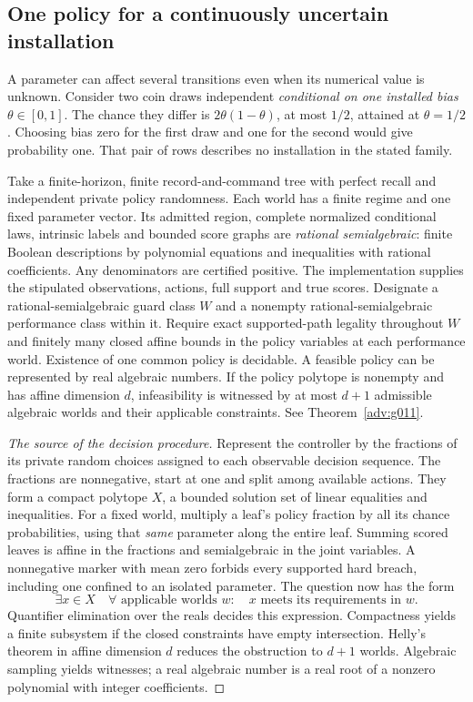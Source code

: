 \subsection{One policy for a continuously uncertain installation}\label{body:continuous}
A parameter can affect several transitions even when its numerical value is unknown. Consider two coin draws independent \emph{conditional on one installed bias} \(\theta\in[0,1]\). The chance they differ is \(2\theta(1-\theta)\), at most \(1/2\), attained at \(\theta=1/2\). Choosing bias zero for the first draw and one for the second would give probability one. That pair of rows describes no installation in the stated family.

\begin{theorem}\label{body:algebraic}
Take a finite-horizon, finite record-and-command tree with perfect recall and independent private policy randomness. Each world has a finite regime and one fixed parameter vector. Its admitted region, complete normalized conditional laws, intrinsic labels and bounded score graphs are \emph{rational semialgebraic}: finite Boolean descriptions by polynomial equations and inequalities with rational coefficients. Any denominators are certified positive. The implementation supplies the stipulated observations, actions, full support and true scores. Designate a rational-semialgebraic guard class \(W\) and a nonempty rational-semialgebraic performance class within it. Require exact supported-path legality throughout \(W\) and finitely many closed affine bounds in the policy variables at each performance world. Existence of one common policy is decidable. A feasible policy can be represented by real algebraic numbers. If the policy polytope is nonempty and has affine dimension \(d\), infeasibility is witnessed by at most \(d+1\) admissible algebraic worlds and their applicable constraints. See Theorem~\ref{adv:g011}.
\end{theorem}
\begin{proof}[The source of the decision procedure]
Represent the controller by the fractions of its private random choices assigned to each observable decision sequence. The fractions are nonnegative, start at one and split among available actions. They form a compact polytope \(X\), a bounded solution set of linear equalities and inequalities. For a fixed world, multiply a leaf's policy fraction by all its chance probabilities, using that \emph{same} parameter along the entire leaf. Summing scored leaves is affine in the fractions and semialgebraic in the joint variables. A nonnegative marker with mean zero forbids every supported hard breach, including one confined to an isolated parameter. The question now has the form
\[
 \exists x\in X\quad\forall\text{ applicable worlds }w:\quad
               x\text{ meets its requirements in }w .
\]
Quantifier elimination over the reals decides this expression. Compactness yields a finite subsystem if the closed constraints have empty intersection. Helly's theorem in affine dimension \(d\) reduces the obstruction to \(d+1\) worlds. Algebraic sampling yields witnesses; a real algebraic number is a real root of a nonzero polynomial with integer coefficients.
\end{proof}
